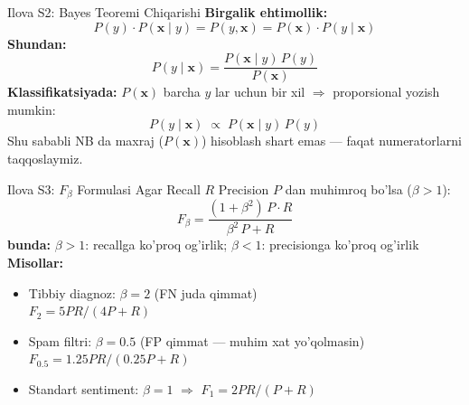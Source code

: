 \documentclass[aspectratio=169,11pt]{beamer}
\newcommand{\bunda}[1]{{\small\textbf{bunda:}\; #1}}
\begin{document}
\begin{frame}{Ilova S2: Bayes Teoremi Chiqarishi}
  \small
  \textbf{Birgalik ehtimollik:}
  \[
    P(y)\cdot P(\mathbf{x}\mid y)
    = P(y,\mathbf{x})
    = P(\mathbf{x})\cdot P(y\mid\mathbf{x})
  \]
  \textbf{Shundan:}
  \[
    P(y\mid\mathbf{x})
    =\frac{P(\mathbf{x}\mid y)\,P(y)}{P(\mathbf{x})}
  \]
  \textbf{Klassifikatsiyada:}
  $P(\mathbf{x})$ barcha $y$ lar uchun bir xil
  $\Rightarrow$ proporsional yozish mumkin:
  \[
    P(y\mid\mathbf{x})\;\propto\; P(\mathbf{x}\mid y)\,P(y)
  \]
  Shu sababli NB da maxraj ($P(\mathbf{x})$) hisoblash shart emas ---
  faqat numeratorlarni taqqoslaymiz.
\end{frame}

\begin{frame}{Ilova S3: $F_\beta$ Formulasi}
  \small
  Agar Recall $R$ Precision $P$ dan muhimroq bo'lsa ($\beta>1$):
  \[
    F_\beta = \frac{(1+\beta^2)\,P\cdot R}{\beta^2\,P + R}
  \]
  \bunda{$\beta>1$: recallga ko'proq og'irlik;\quad
         $\beta<1$: precisionga ko'proq og'irlik}\\[6pt]
  \textbf{Misollar:}
  \begin{itemize}
    \item Tibbiy diagnoz: $\beta=2$ (FN juda qimmat)\\
          $F_2 = 5PR/(4P+R)$
    \item Spam filtri: $\beta=0.5$ (FP qimmat --- muhim xat yo'qolmasin)\\
          $F_{0.5} = 1.25PR/(0.25P+R)$
    \item Standart sentiment: $\beta=1$ $\Rightarrow$
          $F_1 = 2PR/(P+R)$
  \end{itemize}
\end{frame}
\end{document}
